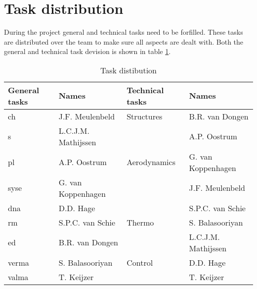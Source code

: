 \section{Task distribution}
During the project general and technical tasks need to be forfilled. These tasks are distributed over the team to make sure all aspects are dealt with. Both the general and technical task devision is shown in table \ref{tab:taskdist}.

\begin{table}[H]
	\caption {Task distibution}
    \begin{tabular}{|p{}|p{}||p{}|p{}|}
    \hline
    General tasks       & Names      & Technical tasks    & Names                    
\\ \hline \hline
    \gls{ch}                      & J.F. Meulenbeld        & Structures           & B.R. van Dongen
\\ \hline
    \gls{s}                      & L.C.J.M. Mathijssen    & ~                    & A.P. Oostrum 
\\ \hline
    \gls{pl}                       & A.P. Oostrum           & Aerodynamics         & G. van Koppenhagen        
\\ \hline
    \gls{syse}            & G. van Koppenhagen     & ~                    & J.F. Meulenbeld             
\\ \hline
    \gls{dna}  & D.D. Hage              & ~                    & S.P.C. van Schie                       
\\ \hline
    \gls{rm}                  & S.P.C. van Schie       & Thermo               & S. Balasooriyan                       
\\ \hline
    \gls{ed}                        & B.R. van Dongen        & ~                    & L.C.J.M. Mathijssen                        
\\ \hline
    \gls{verma}       & S. Balasooriyan        & Control              & D.D. Hage                       
\\ \hline
    \gls{valma}         & T. Keijzer             & ~                    & T. Keijzer                        
\\ \hline
    \end{tabular}
    \label{tab:taskdist}
\end{table}